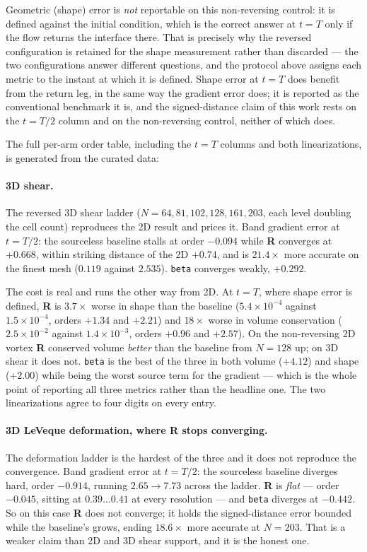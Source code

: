 \documentclass[preprint,3p,11pt]{elsarticle}
\begin{document}
Geometric (shape) error is \emph{not} reportable on this non-reversing control:
it is defined against the initial condition, which is the correct answer at
$t=T$ only if the flow returns the interface there. That is precisely why the
reversed configuration is retained for the shape measurement rather than
discarded --- the two configurations answer different questions, and the
protocol above assigns each metric to the instant at which it is defined.
Shape error at $t=T$ does benefit from the return leg, in the same way the
gradient error does; it is reported as the conventional benchmark it is, and
the signed-distance claim of this work rests on the $t=T/2$ column and on the
non-reversing control, neither of which does.

The full per-arm order table, including the $t=T$ columns and both
linearizations, is generated from the curated data:



\paragraph{3D shear.}
The reversed 3D shear ladder ($N = 64, 81, 102, 128, 161, 203$, each level
doubling the cell count) reproduces the 2D result and prices it. Band gradient
error at $t=T/2$: the sourceless baseline stalls at order $-0.094$ while
\textbf{R} converges at $+0.668$, within striking distance of the 2D $+0.74$,
and is $21.4\times$ more accurate on the finest mesh ($0.119$ against $2.535$).
\texttt{beta} converges weakly, $+0.292$.

The cost is real and runs the other way from 2D. At $t=T$, where shape error is
defined, \textbf{R} is $3.7\times$ worse in shape than the baseline
($5.4\times10^{-4}$ against $1.5\times10^{-4}$, orders $+1.34$ and $+2.21$) and
$18\times$ worse in volume conservation ($2.5\times10^{-2}$ against
$1.4\times10^{-3}$, orders $+0.96$ and $+2.57$). On the non-reversing 2D vortex
\textbf{R} conserved volume \emph{better} than the baseline from $N=128$ up; on
3D shear it does not. \texttt{beta} is the best of the three in both volume
($+4.12$) and shape ($+2.00$) while being the worst source term for the
gradient --- which is the whole point of reporting all three metrics rather
than the headline one. The two linearizations agree to four digits on every
entry.

\paragraph{3D LeVeque deformation, where \textbf{R} stops converging.}
The deformation ladder is the hardest of the three and it does not reproduce
the convergence. Band gradient error at $t=T/2$: the sourceless baseline
diverges hard, order $-0.914$, running $2.65 \to 7.73$ across the ladder.
\textbf{R} is \emph{flat} --- order $-0.045$, sitting at $0.39\ldots0.41$ at
every resolution --- and \texttt{beta} diverges at $-0.442$. So on this case
\textbf{R} does not converge; it holds the signed-distance error bounded while
the baseline's grows, ending $18.6\times$ more accurate at $N=203$. That is a
weaker claim than 2D and 3D shear support, and it is the honest one.
\end{document}
